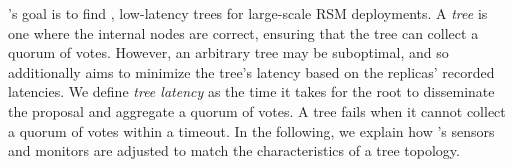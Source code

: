\optitree's goal is to find \validt, low-latency trees for large-scale RSM deployments.
A \textit{\validt tree} is one where the internal nodes are correct, ensuring that the tree can collect a quorum of votes.
However, an arbitrary \validt tree may be suboptimal, and so \optitree additionally aims to minimize the tree's latency based on the replicas' recorded latencies.
We define \textit{tree latency} as the time it takes for the root to disseminate the proposal and aggregate a quorum of votes.
A tree fails when it cannot collect a quorum of votes within a timeout.
In the following, we explain how \sysname's sensors and monitors are adjusted to match the characteristics of a tree topology.
